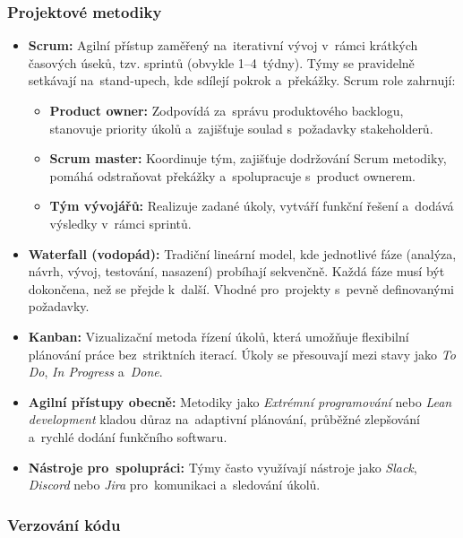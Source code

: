 \documentclass[male,czech,api_bc]{kitheses}
\begin{document}
\subsubsection{Projektové metodiky}

\begin{itemize}
	\item \textbf{Scrum:} Agilní přístup zaměřený na~iterativní vývoj v~rámci krátkých časových úseků, tzv. sprintů (obvykle 1--4~týdny). Týmy se pravidelně setkávají na~stand-upech, kde sdílejí pokrok a~překážky. Scrum role zahrnují:
	\begin{itemize}
		\item \textbf{Product owner:} Zodpovídá za~správu produktového backlogu, stanovuje priority úkolů a~zajišťuje soulad s~požadavky stakeholderů.
		\item \textbf{Scrum master:} Koordinuje tým, zajišťuje dodržování Scrum metodiky, pomáhá odstraňovat překážky a~spolupracuje s~product ownerem.
		\item \textbf{Tým vývojářů:} Realizuje zadané úkoly, vytváří funkční řešení a~dodává výsledky v~rámci sprintů.
	\end{itemize}
	
	\item \textbf{Waterfall (vodopád):} Tradiční lineární model, kde jednotlivé fáze (analýza, návrh, vývoj, testování, nasazení) probíhají sekvenčně. Každá fáze musí být dokončena, než se přejde k~další. Vhodné pro~projekty s~pevně definovanými požadavky.
	
	\item \textbf{Kanban:} Vizualizační metoda řízení úkolů, která umožňuje flexibilní plánování práce bez~striktních iterací. Úkoly se přesouvají mezi stavy jako \textit{To Do}, \textit{In Progress} a~\textit{Done}.
	
	\item \textbf{Agilní přístupy obecně:} Metodiky jako \textit{Extrémní programování} nebo \textit{Lean development} kladou důraz na~adaptivní plánování, průběžné zlepšování a~rychlé dodání funkčního softwaru.
	
	\item \textbf{Nástroje pro~spolupráci:} Týmy často využívají nástroje jako \textit{Slack}, \textit{Discord} nebo \textit{Jira} pro~komunikaci a~sledování úkolů.
\end{itemize}

\subsubsection{Verzování kódu}
\end{document}
